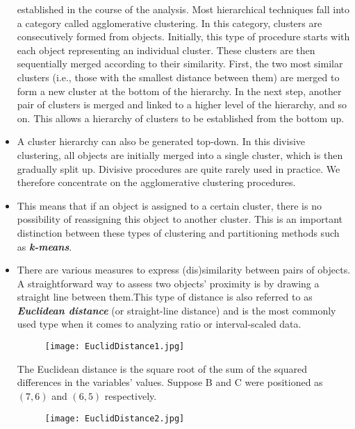 \documentclass[a4paper,12pt]{article}
\begin{document}
\begin{itemize}
established in the course of the analysis. Most hierarchical techniques fall into a
category called agglomerative clustering. In this category, clusters are consecutively
formed from objects. Initially, this type of procedure starts with each object
representing an individual cluster. These clusters are then sequentially merged
according to their similarity. First, the two most similar clusters (i.e., those with
the smallest distance between them) are merged to form a new cluster at the bottom
of the hierarchy. In the next step, another pair of clusters is merged and linked to a
higher level of the hierarchy, and so on. This allows a hierarchy of clusters to be
established from the bottom up.
\item A cluster hierarchy can also be generated top-down. In this divisive clustering,
all objects are initially merged into a single cluster, which is then gradually split up. Divisive procedures are quite rarely used in practice. We therefore
concentrate on the agglomerative clustering procedures.
\item This means that if an object is assigned
to a certain cluster, there is no possibility of reassigning this object to another
cluster. This is an important distinction between these types of clustering and
partitioning methods such as \textbf{\textit{k-means}}.
\newpage
\item There are various measures to express (dis)similarity between pairs of objects.
A straightforward way to assess two objects’ proximity is by drawing a straight line
between them.This type of distance is also referred to as
\textbf{\textit{Euclidean distance}} (or straight-line distance) and is the most commonly used type
when it comes to analyzing ratio or interval-scaled data.
\begin{figure}[h!]
\begin{center}
  \texttt{[image: EuclidDistance1.jpg]}\\
\end{center}
\end{figure}

The Euclidean distance is the square root of the sum of the squared differences in
the variables’ values. Suppose B and C were positioned as $(7,6)$ and $(6,5)$ respectively.
\begin{figure}[h!]
\begin{center}
  \texttt{[image: EuclidDistance2.jpg]}\\
\end{center}
\end{figure}


\end{itemize}
\end{document}
